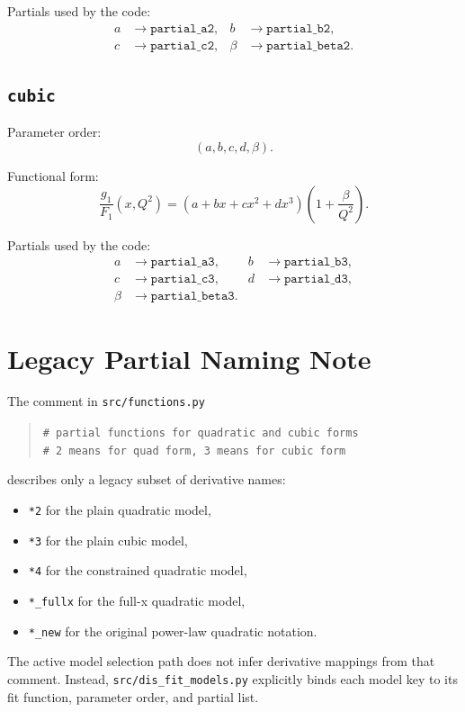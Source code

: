 \documentclass[11pt]{article}
\begin{document}
Partials used by the code:
\begin{align*}
a     &\rightarrow \texttt{partial\_a2}, &
b     &\rightarrow \texttt{partial\_b2}, \\
c     &\rightarrow \texttt{partial\_c2}, &
\beta &\rightarrow \texttt{partial\_beta2}.
\end{align*}

\subsection{\texttt{cubic}}

Parameter order:
\[
(a, b, c, d, \beta).
\]

Functional form:
\begin{equation}
\frac{g_1}{F_1}(x,Q^2)
=
(a + bx + cx^2 + dx^3)\left(1+\frac{\beta}{Q^2}\right).
\end{equation}

Partials used by the code:
\begin{align*}
a     &\rightarrow \texttt{partial\_a3}, &
b     &\rightarrow \texttt{partial\_b3}, \\
c     &\rightarrow \texttt{partial\_c3}, &
d     &\rightarrow \texttt{partial\_d3}, \\
\beta &\rightarrow \texttt{partial\_beta3}.
\end{align*}

\section{Legacy Partial Naming Note}

The comment in \texttt{src/functions.py}
\begin{quote}
\texttt{\# partial functions for quadratic and cubic forms} \\
\texttt{\# 2 means for quad form, 3 means for cubic form}
\end{quote}
describes only a legacy subset of derivative names:
\begin{itemize}
\item \texttt{*2} for the plain quadratic model,
\item \texttt{*3} for the plain cubic model,
\item \texttt{*4} for the constrained quadratic model,
\item \texttt{*\_fullx} for the full-x quadratic model,
\item \texttt{*\_new} for the original power-law quadratic notation.
\end{itemize}

The active model selection path does not infer derivative mappings from that
comment.  Instead, \texttt{src/dis\_fit\_models.py} explicitly binds each model
key to its fit function, parameter order, and partial list.
\end{document}
